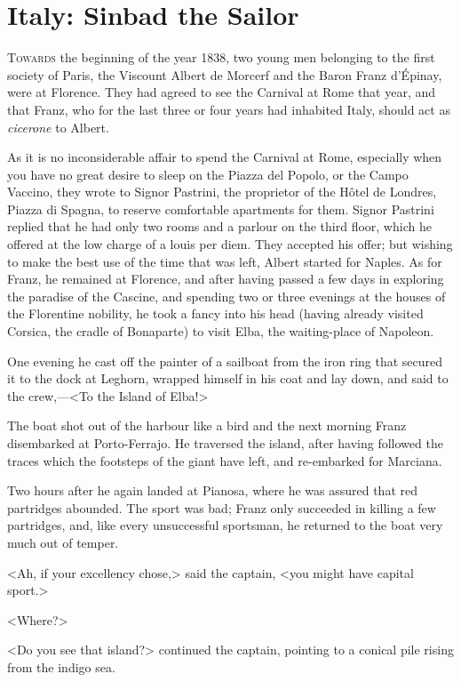 \chapter{Italy: Sinbad the Sailor} 

 \lettrine{T}{owards} the beginning of the year 1838, two young men belonging to the first society of Paris, the Viscount Albert de Morcerf and the Baron Franz d'Épinay, were at Florence. They had agreed to see the Carnival at Rome that year, and that Franz, who for the last three or four years had inhabited Italy, should act as \textit{cicerone} to Albert. 

 As it is no inconsiderable affair to spend the Carnival at Rome, especially when you have no great desire to sleep on the Piazza del Popolo, or the Campo Vaccino, they wrote to Signor Pastrini, the proprietor of the Hôtel de Londres, Piazza di Spagna, to reserve comfortable apartments for them. Signor Pastrini replied that he had only two rooms and a parlour on the third floor, which he offered at the low charge of a louis per diem. They accepted his offer; but wishing to make the best use of the time that was left, Albert started for Naples. As for Franz, he remained at Florence, and after having passed a few days in exploring the paradise of the Cascine, and spending two or three evenings at the houses of the Florentine nobility, he took a fancy into his head (having already visited Corsica, the cradle of Bonaparte) to visit Elba, the waiting-place of Napoleon. 

 One evening he cast off the painter of a sailboat from the iron ring that secured it to the dock at Leghorn, wrapped himself in his coat and lay down, and said to the crew,—<To the Island of Elba!> 

 The boat shot out of the harbour like a bird and the next morning Franz disembarked at Porto-Ferrajo. He traversed the island, after having followed the traces which the footsteps of the giant have left, and re-embarked for Marciana. 

 Two hours after he again landed at Pianosa, where he was assured that red partridges abounded. The sport was bad; Franz only succeeded in killing a few partridges, and, like every unsuccessful sportsman, he returned to the boat very much out of temper. 

 <Ah, if your excellency chose,> said the captain, <you might have capital sport.> 

 <Where?> 

 <Do you see that island?> continued the captain, pointing to a conical pile rising from the indigo sea. 

